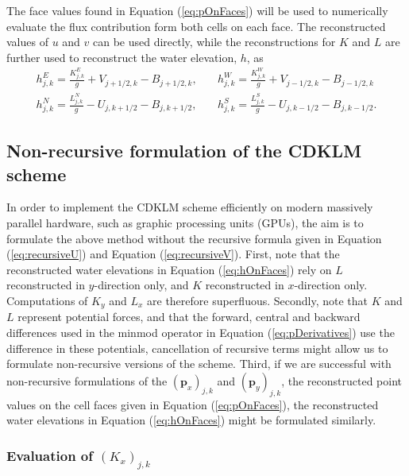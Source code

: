 \documentclass[11pt, a4paper]{article}
\newcommand{\vecp}[0]{\bm{p}}
\newcommand{\eastface}[1]{#1_{j + 1/2, k}}
\newcommand{\westface}[1]{#1_{j - 1/2, k}}
\newcommand{\northface}[1]{#1_{j, k + 1/2}}
\newcommand{\southface}[1]{#1_{j, k - 1/2}}
\newcommand{\eref}[1]{Equation (\ref{eq:#1})}
\begin{document}
The face values found in \eref{pOnFaces} will be used to numerically evaluate the flux contribution form both cells on each face.
The reconstructed values of $u$ and $v$ can be used directly, while the reconstructions for $K$ and $L$ are further used to reconstruct the water elevation, $h$, as
\begin{equation}
	\begin{split}
		h_{j,k}^E = \frac{K_{j,k}^E}{g} + \eastface{V} - \eastface{B} , &\quad
		h_{j,k}^W = \frac{K_{j,k}^W}{g} + \westface{V} - \westface{B} \\
		h_{j,k}^N = \frac{L_{j,k}^N}{g} - \northface{U} - \northface{B}, &\quad
		h_{j,k}^S = \frac{L_{j,k}^S}{g} - \southface{U} - \southface{B}.
	\end{split}
	\label{eq:hOnFaces}
\end{equation}



\subsection{Non-recursive formulation of the CDKLM scheme}
In order to implement the CDKLM scheme efficiently on modern massively parallel hardware, such as graphic processing units (GPUs), the aim is to formulate the above method without the recursive formula given in \eref{recursiveU} and \eref{recursiveV}.
First, note that the reconstructed water elevations in \eref{hOnFaces} rely on $L$ reconstructed in $y$-direction only, and $K$ reconstructed in $x$-direction only.
Computations of $K_y$ and $L_x$ are therefore superfluous.
Secondly, note that $K$ and $L$ represent potential forces, and that the forward, central and backward differences used in the minmod operator in \eref{pDerivatives} use the difference in these potentials, cancellation of recursive terms might allow us to formulate non-recursive versions of the scheme.
Third, if we are successful with non-recursive formulations of the $\left(\vecp_x\right)_{j,k}$ and $\left(\vecp_y\right)_{j,k}$, the reconstructed point values on the cell faces given in \eref{pOnFaces}, the reconstructed water elevations in \eref{hOnFaces} might be formulated similarly.


\subsubsection{Evaluation of $(K_x)_{j,k}$}
\end{document}
